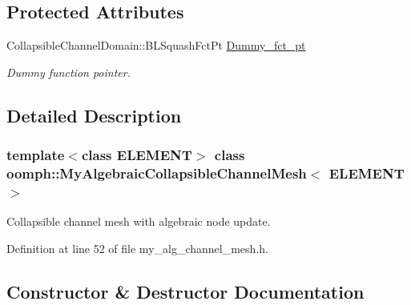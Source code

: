 \subsection*{Protected Attributes}
\begin{DoxyCompactItemize}
\item 
Collapsible\+Channel\+Domain\+::\+B\+L\+Squash\+Fct\+Pt \hyperlink{classoomph_1_1MyAlgebraicCollapsibleChannelMesh_ad60e33d1b61229a7d591bd963713aa03}{Dummy\+\_\+fct\+\_\+pt}
\begin{DoxyCompactList}\small\item\em Dummy function pointer. \end{DoxyCompactList}\end{DoxyCompactItemize}


\subsection{Detailed Description}
\subsubsection*{template$<$class E\+L\+E\+M\+E\+NT$>$\newline
class oomph\+::\+My\+Algebraic\+Collapsible\+Channel\+Mesh$<$ E\+L\+E\+M\+E\+N\+T $>$}

Collapsible channel mesh with algebraic node update. 

Definition at line 52 of file my\+\_\+alg\+\_\+channel\+\_\+mesh.\+h.



\subsection{Constructor \& Destructor Documentation}
\mbox{\label{classoomph_1_1MyAlgebraicCollapsibleChannelMesh_a1a77973034fec46c16a41d1f4d250b0a}} 

